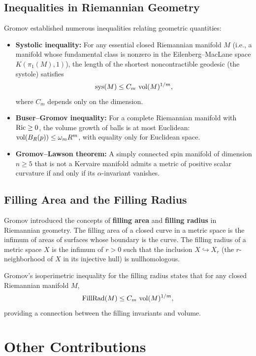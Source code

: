 \subsection{Inequalities in Riemannian Geometry}

Gromov established numerous inequalities relating geometric quantities:
\begin{itemize}
    \item \textbf{Systolic inequality:} For any essential closed Riemannian manifold \(M\) (i.e., a manifold whose fundamental class is nonzero in the Eilenberg--MacLane space \(K(\pi_1(M), 1)\)), the length of the shortest noncontractible geodesic (the systole) satisfies
    \[
    \operatorname{sys}(M) \leq C_m \, \operatorname{vol}(M)^{1/m},
    \]
    where \(C_m\) depends only on the dimension.
    \item \textbf{Buser--Gromov inequality:} For a complete Riemannian manifold with \(\operatorname{Ric} \geq 0\), the volume growth of balls is at most Euclidean: \(\operatorname{vol}(B_R(p)) \leq \omega_m R^m\), with equality only for Euclidean space.
    \item \textbf{Gromov--Lawson theorem:} A simply connected spin manifold of dimension \(n \geq 5\) that is not a Kervaire manifold admits a metric of positive scalar curvature if and only if its \(\alpha\)-invariant vanishes.
\end{itemize}

\subsection{Filling Area and the Filling Radius}

Gromov introduced the concepts of \textbf{filling area} and \textbf{filling radius} in Riemannian geometry. The filling area of a closed curve in a metric space is the infimum of areas of surfaces whose boundary is the curve. The filling radius of a metric space \(X\) is the infimum of \(r > 0\) such that the inclusion \(X \hookrightarrow X_r\) (the \(r\)-neighborhood of \(X\) in its injective hull) is nullhomologous.

Gromov's isoperimetric inequality for the filling radius states that for any closed Riemannian manifold \(M\),
\[
\operatorname{FillRad}(M) \leq C_m \, \operatorname{vol}(M)^{1/m},
\]
providing a connection between the filling invariants and volume.

\section{Other Contributions}


